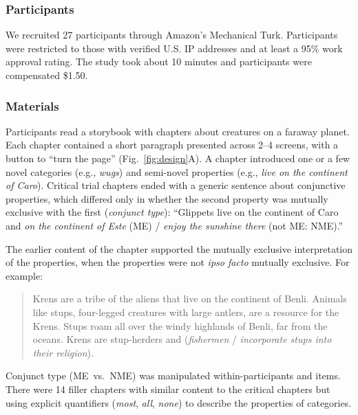 \documentclass[10pt,letterpaper]{article}
\begin{document}
\subsubsection{Participants}

We recruited 27 participants through Amazon's Mechanical Turk.
Participants were restricted to those with verified U.S. IP addresses and at least a 95\% work approval rating. 
The study took about 10 minutes and participants were compensated \$1.50.

\subsubsection{Materials}

Participants read a storybook with chapters about creatures on a faraway planet.
Each chapter contained a short paragraph presented across 2--4 screens, with a button to ``turn the page'' (Fig.~\ref{fig:design}A).
A chapter introduced one or a few novel categories (e.g., \emph{wugs}) and semi-novel properties (e.g., \emph{live on the continent of Caro}).
Critical trial chapters ended with a generic sentence about conjunctive properties, which differed only in whether the second property was mutually exclusive with the first (\emph{conjunct type}): ``Glippets live on the continent of Caro and \emph{on the continent of Este} (ME) /  \emph{enjoy the sunshine there} (not ME: NME).''

The earlier content of the chapter supported the mutually exclusive interpretation of the properties, when the properties were not \emph{ipso facto} mutually exclusive. For example: 

\begin{quote}
\small
Krens are a tribe of the aliens that live on the continent of Benli. Animals like stups, four-legged creatures with large antlers, are a resource for the Krens. Stups roam all over the windy highlands of Benli, far from the oceans. Krens are stup-herders and (\emph{fishermen} / \emph{incorporate stups into their religion}).
\end{quote}


\noindent Conjunct type (ME~vs.~NME) was manipulated within-participants and items. 
There were 14 filler chapters with similar content to the critical chapters but using explicit quantifiers (\emph{most}, \emph{all}, \emph{none}) to describe the properties of categories.
\end{document}
